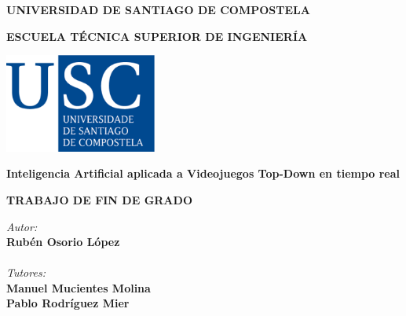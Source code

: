 \pagestyle{empty}
\begin{center}
{\bf\large UNIVERSIDAD DE SANTIAGO DE COMPOSTELA}

\vspace{0.5cm}
{\bf\large ESCUELA TÉCNICA SUPERIOR DE INGENIERÍA}

\vspace{1.5cm}
\includegraphics[width=5cm]{figuras/logo_usc.eps}

\vspace{1.5cm}
{\bf\LARGE Inteligencia Artificial aplicada a Videojuegos Top-Down en tiempo real}

\vspace{1cm}
{\bf\normalsize TRABAJO DE FIN DE GRADO}

\end{center}



\vfill
\begin{flushright}

{\it\small Autor:} \\
{\bf\small Rubén Osorio López} \\
~ \\
{\it\small Tutores:} \\
{\bf\small Manuel Mucientes Molina} \\
{\bf\small Pablo Rodríguez Mier} \\
\end{flushright}
\clearpage

